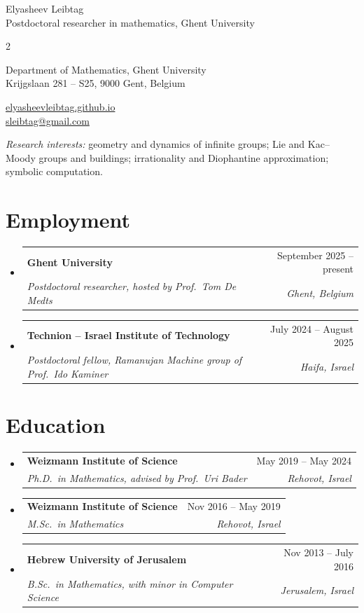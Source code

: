 \documentclass[letterpaper,11pt]{article}
\makeatletter
\newcommand{\resumeSubheading}[4]{
  \vspace{-3pt}\item
    \begin{tabular*}{0.97\textwidth}[t]{l@{\extracolsep{\fill}}r}
      \textbf{#1} & #2 \\
      \textit{\small #3} & \textit{\small #4} \\
    \end{tabular*}\vspace{-10pt}
}
\newcommand{\resumeSubHeadingListStart}{\begin{itemize}[leftmargin=0.15in, label={}]}
\newcommand{\resumeSubHeadingListEnd}{\end{itemize}}
\makeatother
\begin{document}
\begin{center}
    {\LARGE Elyasheev Leibtag} \\
    {Postdoctoral researcher in mathematics, Ghent University}\vspace{0pt}
    \begin{multicols}{2}
    \begin{flushleft}
    Department of Mathematics, Ghent University \\
    Krijgslaan 281 -- S25, 9000 Gent, Belgium \\
    \end{flushleft}

    \begin{flushright}
    \href{https://elyasheevleibtag.github.io/}{elyasheevleibtag.github.io} \\
    \href{mailto:sleibtag@gmail.com}{sleibtag@gmail.com}
    \end{flushright}
    \end{multicols}
\end{center}

\noindent\textit{Research interests:} geometry and dynamics of infinite groups; Lie and Kac--Moody groups and buildings; irrationality and Diophantine approximation; symbolic computation.
\vspace{2pt}


\section{Employment}
\resumeSubHeadingListStart
    \resumeSubheading
        {Ghent University}{September 2025 -- present}
        {Postdoctoral researcher, hosted by Prof.\ Tom De Medts}{Ghent, Belgium}
    \resumeSubheading
        {Technion -- Israel Institute of Technology}{July 2024 -- August 2025}
        {Postdoctoral fellow, Ramanujan Machine group of Prof.\ Ido Kaminer}{Haifa, Israel}
\resumeSubHeadingListEnd


\section{Education}
\resumeSubHeadingListStart
    \resumeSubheading
        {Weizmann Institute of Science}{May 2019 -- May 2024}
        {Ph.D.\ in Mathematics, advised by Prof.\ Uri Bader}{Rehovot, Israel}
    \resumeSubheading
        {Weizmann Institute of Science}{Nov 2016 -- May 2019}
        {M.Sc.\ in Mathematics}{Rehovot, Israel}
    \resumeSubheading
        {Hebrew University of Jerusalem}{Nov 2013 -- July 2016}
        {B.Sc.\ in Mathematics, with minor in Computer Science}{Jerusalem, Israel}
\resumeSubHeadingListEnd
\end{document}
